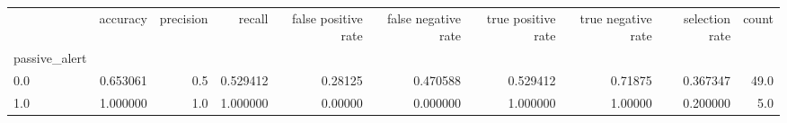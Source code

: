 \begin{tabular}{lrrrrrrrrr}
\toprule
{} &  accuracy &  precision &    recall &  false positive rate &  false negative rate &  true positive rate &  true negative rate &  selection rate &  count \\
passive\_alert &           &            &           &                      &                      &                     &                     &                 &        \\
\midrule
0.0           &  0.653061 &        0.5 &  0.529412 &              0.28125 &             0.470588 &            0.529412 &             0.71875 &        0.367347 &   49.0 \\
1.0           &  1.000000 &        1.0 &  1.000000 &              0.00000 &             0.000000 &            1.000000 &             1.00000 &        0.200000 &    5.0 \\
\bottomrule
\end{tabular}
